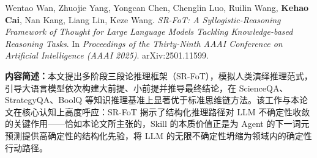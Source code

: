 
\begin{achievements}

\begin{theachievements}[与本论文直接相关的成果]
  \item Wentao Wan, Zhuojie Yang, Yongcan Chen, Chenglin Luo, Ruilin Wang, \textbf{Kehao Cai}, Nan Kang, Liang Lin, Keze Wang.
        \textit{SR-FoT: A Syllogistic-Reasoning Framework of Thought for Large Language Models Tackling Knowledge-based Reasoning Tasks}.
        In \textit{Proceedings of the Thirty-Ninth AAAI Conference on Artificial Intelligence (AAAI 2025)}.
        arXiv:2501.11599.

        \smallskip
        \noindent\textbf{内容简述：}本文提出多阶段三段论推理框架（SR-FoT），模拟人类演绎推理范式，引导大语言模型依次构建大前提、小前提并推导最终结论，在 ScienceQA、StrategyQA、BoolQ 等知识推理基准上显著优于标准思维链方法。该工作与本论文在核心认知上高度呼应：SR-FoT 揭示了结构化推理路径对 LLM 不确定性收敛的关键作用——恰如本论文所主张的，Skill 的本质价值正是为 Agent 的下一词元预测提供高确定性的结构化先验，将 LLM 的无限不确定性坍缩为领域内的确定性行动路径。
\end{theachievements}

\end{achievements}
